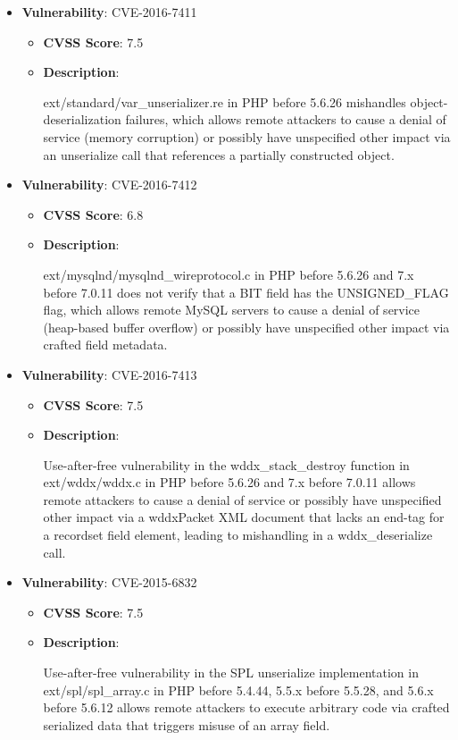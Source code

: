 \documentclass{article}
\begin{document}
\begin{itemize}
        \item \textbf{Vulnerability}: CVE-2016-7411
        \begin{itemize}
            \item \textbf{CVSS Score}:  7.5 
            \item \textbf{Description}:
            \parbox[t]{0.9\linewidth}{
                \ttfamily ext/standard/var\_unserializer.re in PHP before 5.6.26 mishandles object-deserialization failures, which allows remote attackers to cause a denial of service (memory corruption) or possibly have unspecified other impact via an unserialize call that references a partially constructed object.
            }
        \end{itemize}
    
        \item \textbf{Vulnerability}: CVE-2016-7412
        \begin{itemize}
            \item \textbf{CVSS Score}:  6.8 
            \item \textbf{Description}:
            \parbox[t]{0.9\linewidth}{
                \ttfamily ext/mysqlnd/mysqlnd\_wireprotocol.c in PHP before 5.6.26 and 7.x before 7.0.11 does not verify that a BIT field has the UNSIGNED\_FLAG flag, which allows remote MySQL servers to cause a denial of service (heap-based buffer overflow) or possibly have unspecified other impact via crafted field metadata.
            }
        \end{itemize}
    
        \item \textbf{Vulnerability}: CVE-2016-7413
        \begin{itemize}
            \item \textbf{CVSS Score}:  7.5 
            \item \textbf{Description}:
            \parbox[t]{0.9\linewidth}{
                \ttfamily Use-after-free vulnerability in the wddx\_stack\_destroy function in ext/wddx/wddx.c in PHP before 5.6.26 and 7.x before 7.0.11 allows remote attackers to cause a denial of service or possibly have unspecified other impact via a wddxPacket XML document that lacks an end-tag for a recordset field element, leading to mishandling in a wddx\_deserialize call.
            }
        \end{itemize}
    
        \item \textbf{Vulnerability}: CVE-2015-6832
        \begin{itemize}
            \item \textbf{CVSS Score}:  7.5 
            \item \textbf{Description}:
            \parbox[t]{0.9\linewidth}{
                \ttfamily Use-after-free vulnerability in the SPL unserialize implementation in ext/spl/spl\_array.c in PHP before 5.4.44, 5.5.x before 5.5.28, and 5.6.x before 5.6.12 allows remote attackers to execute arbitrary code via crafted serialized data that triggers misuse of an array field.
            }
        \end{itemize}
    

\end{itemize}
\end{document}
